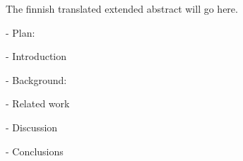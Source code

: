 
The finnish translated extended abstract will go here.

- Plan:

- Introduction

- Background:

- Related work

- Discussion

- Conclusions